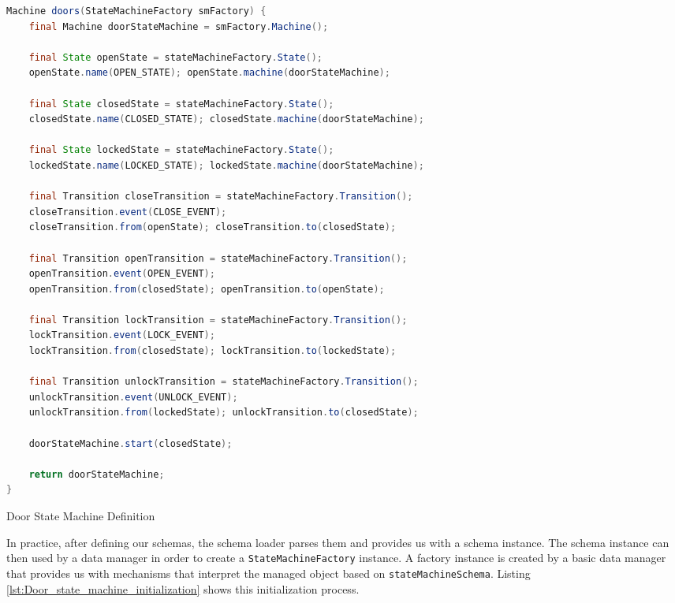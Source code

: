 \begin{sourcecode} [H]
	\begin{lstlisting}[language=Java, escapechar=|]
Machine doors(StateMachineFactory smFactory) {
	final Machine doorStateMachine = smFactory.Machine();

	final State openState = stateMachineFactory.State();
	openState.name(OPEN_STATE); openState.machine(doorStateMachine);

	final State closedState = stateMachineFactory.State();
	closedState.name(CLOSED_STATE); closedState.machine(doorStateMachine);

	final State lockedState = stateMachineFactory.State();
	lockedState.name(LOCKED_STATE); lockedState.machine(doorStateMachine);

	final Transition closeTransition = stateMachineFactory.Transition();
	closeTransition.event(CLOSE_EVENT);
	closeTransition.from(openState); closeTransition.to(closedState);

	final Transition openTransition = stateMachineFactory.Transition();
	openTransition.event(OPEN_EVENT);
	openTransition.from(closedState); openTransition.to(openState);

	final Transition lockTransition = stateMachineFactory.Transition();
	lockTransition.event(LOCK_EVENT);
	lockTransition.from(closedState); lockTransition.to(lockedState);

	final Transition unlockTransition = stateMachineFactory.Transition();
	unlockTransition.event(UNLOCK_EVENT);
	unlockTransition.from(lockedState); unlockTransition.to(closedState);

	doorStateMachine.start(closedState);

	return doorStateMachine;
}
	\end{lstlisting}
	\caption{Door State Machine Definition}
	\label{lst:Door_state_machine}
\end{sourcecode}

In practice, after defining our schemas, the schema loader parses them and provides us with a schema instance.
The schema instance can then used by a data manager in order to create a \texttt{StateMachineFactory} instance. 
A factory instance is created by a basic data manager that provides us with mechanisms that interpret the managed object based on \texttt{stateMachineSchema}.
Listing \ref{lst:Door_state_machine_initialization} shows this initialization process.

